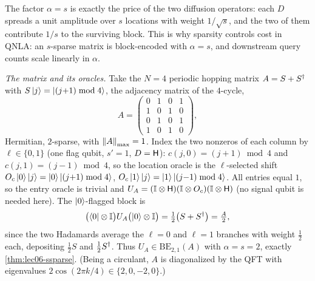 The factor $\alpha=s$ is exactly the price of the two diffusion operators: each $D$
spreads a unit amplitude over $s$ locations with weight $1/\sqrt s$, and the two of
them contribute $1/s$ to the surviving block. This is why sparsity controls cost in
QNLA: an $s$-sparse matrix is block-encoded with $\alpha=s$, and downstream query
counts scale linearly in $\alpha$.

\begin{example}
\label{exa:lec06-hopping}
\emph{The matrix and its oracles.} Take the $N=4$ periodic hopping matrix $A=S+S^{\dagger}$
with $S\ket j=\ket{(j{+}1)\bmod4}$, the adjacency matrix of the $4$-cycle,
\[
  A=\begin{pmatrix}0&1&0&1\\1&0&1&0\\0&1&0&1\\1&0&1&0\end{pmatrix},
\]
Hermitian, $2$-sparse, with $\left\lVert A \right\rVert_{\max}=1$. Index the two nonzeros of each column
by $\ell\in\{0,1\}$ (one flag qubit, $s'=1$, $D=\mathsf{H}$): $c(j,0)=(j{+}1)\bmod4$ and
$c(j,1)=(j{-}1)\bmod4$, so the location oracle is the $\ell$-selected shift
$O_c\ket0\ket j=\ket0\ket{(j{+}1)\bmod4}$, $O_c\ket1\ket j=\ket1\ket{(j{-}1)\bmod4}$.
All entries equal $1$, so the entry oracle is trivial and
$U_A=(\mathbb{I}\otimes\mathsf{H})(\mathbb{I}\otimes O_c)(\mathbb{I}\otimes\mathsf{H})$ (no signal qubit is needed
here). The $\ket{0}$-flagged block is
\[
  \bigl(\bra0\otimes\mathbb{I}\bigr)U_A\bigl(\ket0\otimes\mathbb{I}\bigr)
  =\tfrac12\bigl(S+S^{\dagger}\bigr)=\tfrac{A}{2},
\]
since the two Hadamards average the $\ell{=}0$ and $\ell{=}1$ branches with weight
$\tfrac12$ each, depositing $\tfrac12 S$ and $\tfrac12 S^{\dagger}$. Thus
$U_A\in\mathrm{BE}_{2,1}(A)$ with $\alpha=s=2$, exactly \cref{thm:lec06-ssparse}. (Being
a circulant, $A$ is diagonalized by the QFT with eigenvalues
$2\cos(2\pi k/4)\in\{2,0,-2,0\}$.)


\end{example}

